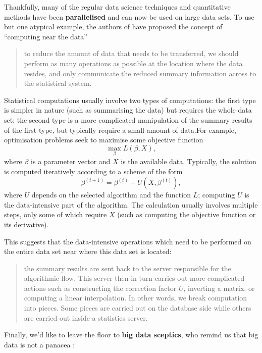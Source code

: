 Thankfully, many of the regular data science techniques and quantitative methods have been \textbf{parallelised} and can now be used on large data sets. To use but one atypical example, the authors of \cite{DSML_BD2} have proposed the concept of ``computing near the data'' \begin{quote}to reduce the amount of data that needs to be transferred, we should perform as many operations as possible at the location where the data resides, and only communicate the reduced summary information across to the statistical system.  \end{quote}
Statistical computations usually involve two types of computations: the first type is simpler in nature (such as summarising the data) but requires the whole data set; the second type is a more complicated manipulation of the summary results of the first type, but typically require a small amount of data.\newpage\noindent For example, optimisation problems seek to maximise some objective function 
$$\max_{\beta}L(\beta,X), $$ where $\beta$ is a parameter vector and $X$ is the available data. Typically, the solution is computed iteratively according to a scheme of the form $$\beta^{(t+1)}=\beta^{(t)}+U(X,\beta^{(t)}),$$ where $U$ depends on the selected algorithm and the function $L$; computing $U$ is the data-intensive part of the algorithm. The calculation usually involves multiple steps, only some of which require $X$ (such as computing the objective function or its derivative). \par This suggests that the data-intensive operations which need to be performed on the entire data set near where this data set is located: \begin{quote}the summary results are sent back to the server responsible for the algorithmic flow. This server then in turn carries out more complicated actions such as constructing the correction factor $U$, inverting a matrix, or computing a linear interpolation. In other words, we break computation into pieces. Some pieces are carried out on the database side while others are carried out inside a statistics server.\end{quote}
Finally, we'd like to leave the floor to \textbf{big data sceptics}, who remind us that big data is not a panacea \cite{DSML_BD1}:
